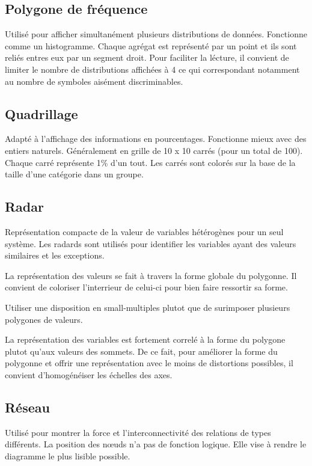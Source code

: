 \documentclass[a4paper,12pt]{article}
\begin{document}
\begin{multicols}{2}
\subsection*{Polygone de fréquence}
\label{sec:org1b1f3a8}
Utilisé pour afficher simultanément plusieurs distributions de données. Fonctionne comme un histogramme. Chaque agrégat est représenté par un point et ils sont reliés entres eux par un segment droit. Pour faciliter la lécture, il convient de limiter le nombre de distributions affichées à 4 \autocite{alansmithLexiqueVisuel} ce qui correspondant notamment au nombre de symboles aisément discriminables.
\subsection*{Quadrillage}
\label{sec:org7a8e40e}
Adapté à l'affichage des informations en pourcentages. Fonctionne mieux avec des entiers naturels. \autocite{alansmithLexiqueVisuel} Généralement en grille de 10 x 10 carrés (pour un total de 100). Chaque carré représente 1\% d'un tout. Les carrés sont colorés sur la base de la taille d'une catégorie dans un groupe. \autocite{mikeyiHowChooseRight2020}
\subsection*{Radar}
\label{sec:orgf5f70b6}
Représentation compacte de la valeur de variables hétérogènes pour un seul système. \autocite{alansmithLexiqueVisuel} Les radards sont utilisés pour identifier les variables ayant des valeurs similaires et les exceptions. \autocite{sosulskiGraphics2019}

La représentation des valeurs se fait à travers la forme globale du polygonne. Il convient de coloriser l'interrieur de celui-ci pour bien faire ressortir sa forme. \autocite{jonathanschwabishRelationship2021}

Utiliser une disposition en small-multiples plutot que de surimposer plusieurs polygones de valeurs. \autocite{jonathanschwabishRelationship2021}

La représentation des variables est fortement correlé à la forme du polygone plutot qu'aux valeurs des sommets. \autocite{sosulskiGraphics2019} De ce fait, pour améliorer la forme du polygonne et offrir une représentation avec le moins de distortions possibles, il convient d'homogénéiser les échelles des axes.
\subsection*{Réseau}
\label{sec:org84f7241}
Utilisé pour montrer la force et l'interconnectivité des relations de types différents. \autocite{alansmithLexiqueVisuel} La position des nœuds n’a pas de fonction logique. Elle vise à rendre le diagramme le plus lisible possible. \autocite{mikeyiHowChooseRight2020}

\end{multicols}
\end{document}
